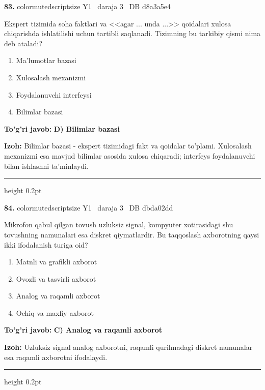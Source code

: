 \documentclass[10pt,a4paper,oneside]{article}
\begin{document}
\noindent\textbf{\color{ink}83.}  {color{muted}scriptsize Y1 \textbullet\ daraja 3 \textbullet\ DB d8a3a5e4}
\par
Ekspert tizimida soha faktlari va <<agar ... unda ...>> qoidalari xulosa chiqarishda ishlatilishi uchun tartibli saqlanadi. Tizimning bu tarkibiy qismi nima deb ataladi?
\begin{enumerate}[label=\Alph*),leftmargin=9mm]
\item Ma'lumotlar bazasi
\item Xulosalash mexanizmi
\item Foydalanuvchi interfeysi
\item Bilimlar bazasi
\end{enumerate}
\begin{tcolorbox}[enhanced,breakable,colback=teal!4,colframe=teal!50!black,boxrule=0.5pt,arc=1.1mm,left=3mm,right=3mm,top=1.7mm,bottom=1.7mm,before skip=2mm,after skip=2mm]
\textbf{\color{teal}To'g'ri javob:} \textbf{D) Bilimlar bazasi}
\par\smallskip
\textbf{Izoh:} Bilimlar bazasi - ekspert tizimidagi fakt va qoidalar to'plami. Xulosalash mexanizmi esa mavjud bilimlar asosida xulosa chiqaradi; interfeys foydalanuvchi bilan ishlashni ta'minlaydi.
\end{tcolorbox}
\vspace{2mm}\hrule height 0.2pt \vspace{3mm}

\noindent\textbf{\color{ink}84.}  {color{muted}scriptsize Y1 \textbullet\ daraja 3 \textbullet\ DB dbda02dd}
\par
Mikrofon qabul qilgan tovush uzluksiz signal, kompyuter xotirasidagi shu tovushning namunalari esa diskret qiymatlardir. Bu taqqoslash axborotning qaysi ikki ifodalanish turiga oid?
\begin{enumerate}[label=\Alph*),leftmargin=9mm]
\item Matnli va grafikli axborot
\item Ovozli va tasvirli axborot
\item Analog va raqamli axborot
\item Ochiq va maxfiy axborot
\end{enumerate}
\begin{tcolorbox}[enhanced,breakable,colback=teal!4,colframe=teal!50!black,boxrule=0.5pt,arc=1.1mm,left=3mm,right=3mm,top=1.7mm,bottom=1.7mm,before skip=2mm,after skip=2mm]
\textbf{\color{teal}To'g'ri javob:} \textbf{C) Analog va raqamli axborot}
\par\smallskip
\textbf{Izoh:} Uzluksiz signal analog axborotni, raqamli qurilmadagi diskret namunalar esa raqamli axborotni ifodalaydi.
\end{tcolorbox}
\vspace{2mm}\hrule height 0.2pt \vspace{3mm}
\end{document}
